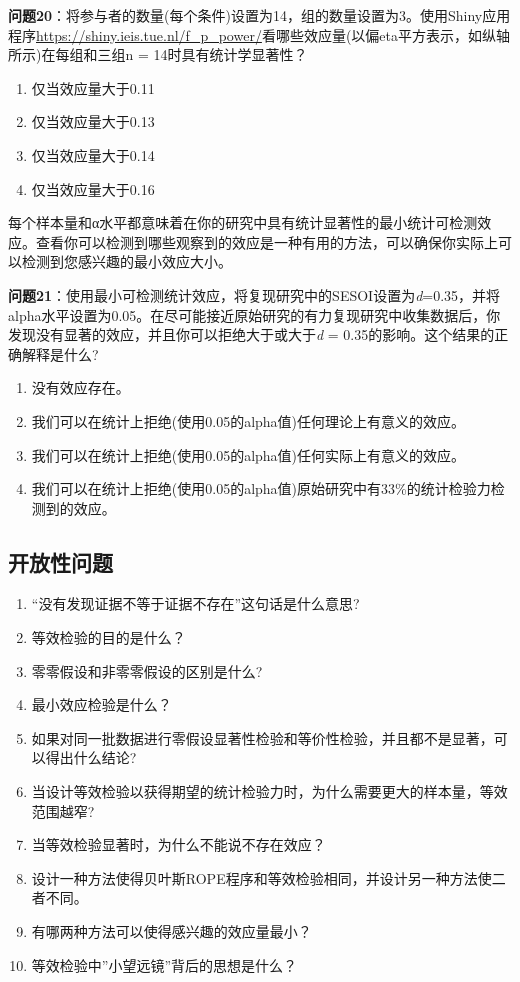 \documentclass[
  letterpaper,
  DIV=11,
  numbers=noendperiod]{scrreprt}
\providecommand{\tightlist}{%
  \setlength{\itemsep}{0pt}\setlength{\parskip}{0pt}}\usepackage{longtable,booktabs,array}
\begin{document}
\textbf{问题20}：将参与者的数量(每个条件)设置为14，组的数量设置为3。使用Shiny应用程序\url{https://shiny.ieis.tue.nl/f_p_power/}看哪些效应量(以偏eta平方表示，如纵轴所示)在每组和三组n
= 14时具有统计学显著性？

\begin{enumerate}
\def\labelenumi{\Alph{enumi})}
\tightlist
\item
  仅当效应量大于0.11
\item
  仅当效应量大于0.13
\item
  仅当效应量大于0.14
\item
  仅当效应量大于0.16
\end{enumerate}

每个样本量和α水平都意味着在你的研究中具有统计显著性的最小统计可检测效应。查看你可以检测到哪些观察到的效应是一种有用的方法，可以确保你实际上可以检测到您感兴趣的最小效应大小。

\textbf{问题21}：使用最小可检测统计效应，将复现研究中的SESOI设置为\emph{d}=0.35，并将alpha水平设置为0.05。在尽可能接近原始研究的有力复现研究中收集数据后，你发现没有显著的效应，并且你可以拒绝大于或大于\emph{d}
= 0.35的影响。这个结果的正确解释是什么?

\begin{enumerate}
\def\labelenumi{\Alph{enumi})}
\tightlist
\item
  没有效应存在。
\item
  我们可以在统计上拒绝(使用0.05的alpha值)任何理论上有意义的效应。
\item
  我们可以在统计上拒绝(使用0.05的alpha值)任何实际上有意义的效应。
\item
  我们可以在统计上拒绝(使用0.05的alpha值)原始研究中有33\%的统计检验力检测到的效应。
\end{enumerate}

\hypertarget{ux5f00ux653eux6027ux95eeux9898-1}{%
\subsection{开放性问题}\label{ux5f00ux653eux6027ux95eeux9898-1}}

\begin{enumerate}
\def\labelenumi{\arabic{enumi}.}
\item
  ``没有发现证据不等于证据不存在''这句话是什么意思?
\item
  等效检验的目的是什么？
\item
  零零假设和非零零假设的区别是什么?
\item
  最小效应检验是什么？
\item
  如果对同一批数据进行零假设显著性检验和等价性检验，并且都不是显著，可以得出什么结论?
\item
  当设计等效检验以获得期望的统计检验力时，为什么需要更大的样本量，等效范围越窄?
\item
  当等效检验显著时，为什么不能说不存在效应？
\item
  设计一种方法使得贝叶斯ROPE程序和等效检验相同，并设计另一种方法使二者不同。
\item
  有哪两种方法可以使得感兴趣的效应量最小？
\item
  等效检验中''小望远镜''背后的思想是什么？
\end{enumerate}
\end{document}
